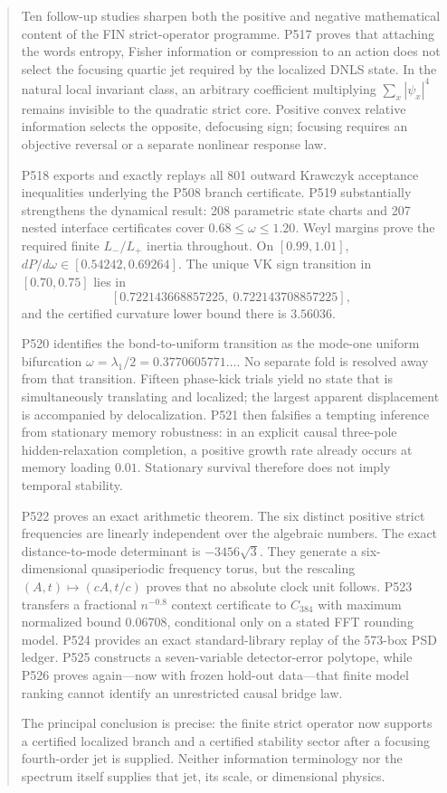 \documentclass[11pt,a4paper]{article}
\begin{document}
\begin{abstract}
Ten follow-up studies sharpen both the positive and negative mathematical content of the FIN strict-operator programme. P517 proves that attaching the words entropy, Fisher information or compression to an action does not select the focusing quartic jet required by the localized DNLS state. In the natural local invariant class, an arbitrary coefficient multiplying $\sum_x|\psi_x|^4$ remains invisible to the quadratic strict core. Positive convex relative information selects the opposite, defocusing sign; focusing requires an objective reversal or a separate nonlinear response law.

P518 exports and exactly replays all 801 outward Krawczyk acceptance inequalities underlying the P508 branch certificate. P519 substantially strengthens the dynamical result: 208 parametric state charts and 207 nested interface certificates cover $0.68\leq\omega\leq1.20$. Weyl margins prove the required finite $L_-/L_+$ inertia throughout. On $[0.99,1.01]$, $dP/d\omega\in[0.54242,0.69264]$. The unique VK sign transition in $[0.70,0.75]$ lies in
\[
 [0.722143668857225,\ 0.722143708857225],
\]
and the certified curvature lower bound there is $3.56036$.

P520 identifies the bond-to-uniform transition as the mode-one uniform bifurcation $\omega=\lambda_1/2=0.3770605771\ldots$. No separate fold is resolved away from that transition. Fifteen phase-kick trials yield no state that is simultaneously translating and localized; the largest apparent displacement is accompanied by delocalization. P521 then falsifies a tempting inference from stationary memory robustness: in an explicit causal three-pole hidden-relaxation completion, a positive growth rate already occurs at memory loading $0.01$. Stationary survival therefore does not imply temporal stability.

P522 proves an exact arithmetic theorem. The six distinct positive strict frequencies are linearly independent over the algebraic numbers. The exact distance-to-mode determinant is $-3456\sqrt3$. They generate a six-dimensional quasiperiodic frequency torus, but the rescaling $(A,t)\mapsto(cA,t/c)$ proves that no absolute clock unit follows. P523 transfers a fractional $n^{-0.8}$ context certificate to $C_{384}$ with maximum normalized bound $0.06708$, conditional only on a stated FFT rounding model. P524 provides an exact standard-library replay of the 573-box PSD ledger. P525 constructs a seven-variable detector-error polytope, while P526 proves again---now with frozen hold-out data---that finite model ranking cannot identify an unrestricted causal bridge law.

The principal conclusion is precise: the finite strict operator now supports a certified localized branch and a certified stability sector after a focusing fourth-order jet is supplied. Neither information terminology nor the spectrum itself supplies that jet, its scale, or dimensional physics.
\end{abstract}
\end{document}
